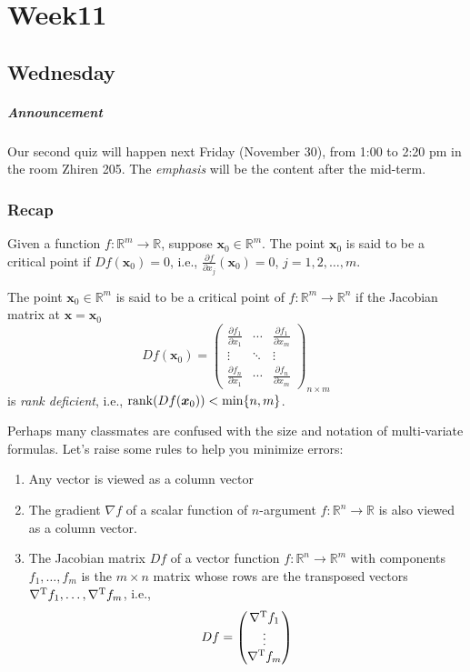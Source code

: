 
\chapter{Week11}

\section{Wednesday}
\paragraph{Announcement}
Our second quiz will happen next Friday (November 30), from 1:00 to 2:20 pm in the room Zhiren 205. The \emph{emphasis} will be the content after the mid-term.

\subsection{Recap}
Given a function $f:\mathbb{R}^m\to\mathbb{R}$, suppose $\bm x_0\in\mathbb{R}^m$. The point $\bm x_0$ is said to be a critical point if $Df(\bm x_0)=0$, i.e., $\frac{\partial f}{\partial x_j}(\bm x_0)=0$, $j=1,2,\dots,m$.
\begin{definition}
The point $\bm x_0\in\mathbb{R}^m$ is said to be a critical point of $f:\mathbb{R}^m\to\mathbb{R}^n$ if the Jacobian matrix at $\bm x=\bm x_0$
\[
Df(\bm x_0)=\begin{pmatrix}
\frac{\partial f_1}{\partial x_1}&
\cdots&\frac{\partial f_1}{\partial x_m}\\
\vdots&\ddots&\vdots\\
\frac{\partial f_n}{\partial x_1}&\cdots&
\frac{\partial f_n}{\partial x_m}
\end{pmatrix}_{n\times m}
\]
is \emph{rank deficient}, i.e., $\operatorname{rank}(Df(\bm x_0))<\min\{n,m\}$.
\end{definition}
Perhaps many classmates are confused with the size and notation of multi-variate formulas. Let's raise some rules to help you minimize errors:
\begin{enumerate}
\item
Any vector is viewed as a column vector
\item
The gradient $\nabla f$ of a scalar function of $n$-argument $f:\mathbb{R}^n\to\mathbb{R}$ is also viewed as a column vector.
\item
The Jacobian matrix $Df$ of a vector function $f:\mathbb{R}^n\to\mathbb{R}^m$ with components $f_1,\dots,f_m$ is the $m\times n$ matrix whose rows are the transposed vectors $\nabla^{\mathrm T} f_1,\dots,\nabla^{\mathrm T} f_m$, i.e., 
\[
Df=\begin{pmatrix}
\nabla^{\mathrm T} f_1\\\vdots\\\nabla^{\mathrm T} f_m
\end{pmatrix}
\]
\end{enumerate}


